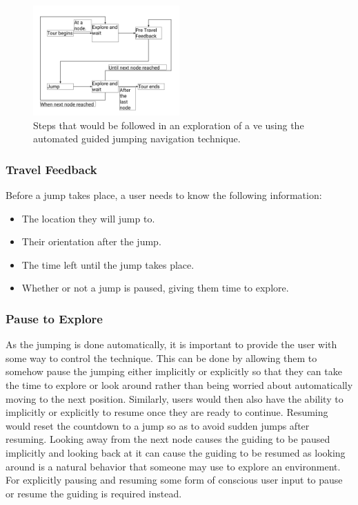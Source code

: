 \begin{figure}[]
	\centering
	\includegraphics[width=0.5\textwidth]{images/interaction-design-steps.pdf}
	\caption{Steps that would be followed in an exploration of a \acrshort{ve} using the automated guided jumping navigation technique.}
	\label{fig:interaction-design-steps}
\end{figure}

\subsubsection{Travel Feedback}
\label{subsubsection AGJ ID ES: Travel Feedback}
Before a jump takes place, a user needs to know the following information:
\begin{itemize}
	\item The location they will jump to.
	\item Their orientation after the jump.
	\item The time left until the jump takes place.
	\item Whether or not a jump is paused, giving them time to explore.
\end{itemize}

\subsubsection{Pause to Explore}
\label{subsubsection AGJ ID ES: Pause to Explore}
As the jumping is done automatically, it is important to provide the user with some way to control the technique. This can be done by allowing them to somehow pause the jumping either implicitly or explicitly so that they can take the time to explore or look around rather than being worried about automatically moving to the next position. Similarly, users would then also have the ability to implicitly or explicitly to resume once they are ready to continue. Resuming would reset the countdown to a jump so as to avoid sudden jumps after resuming. Looking away from the next node causes the guiding to be paused implicitly and looking back at it can cause the guiding to be resumed as looking around is a natural behavior that someone may use to explore an environment. For explicitly pausing and resuming some form of conscious user input to pause or resume the guiding is required instead.  

